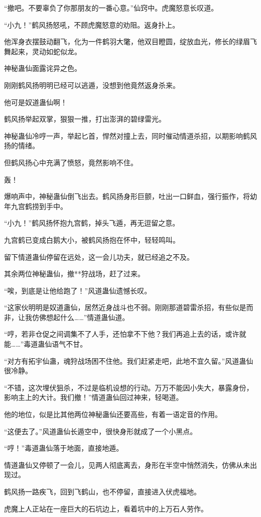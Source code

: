 \begin{this_body}
“撤吧。不要辜负了你那朋友的一番心意。”仙窍中。虎魔怒意长叹道。

“小九！”鹤风扬怒吼，不顾虎魔怒意的劝阻。返身扑上。

他浑身衣摆鼓动翻飞，化为一件鹤羽大氅，他双目瞪圆，绽放血光，修长的绿眉飞舞起来，灵动如蛇似龙。

神秘蛊仙面露诧异之色。

刚刚鹤风扬明明已经可以逃遁，没想到他竟然返身杀来。

他可是奴道蛊仙啊！

鹤风扬举起双掌，狠狠一推，打出澎湃的碧绿雷光。

神秘蛊仙冷哼一声，举起匕首，悍然对撞上去，同时催动情道杀招，以期影响鹤风扬的情绪。

但鹤风扬心中充满了愤怒，竟然影响不住。

轰！

爆响声中，神秘蛊仙倒飞出去。鹤风扬身形巨颤，吐出一口鲜血，强行振作，将幼年九宫鹤捞到手中。

“小九！”鹤风扬怀抱九宫鹤，掉头飞遁，再无逗留之意。

九宫鹤已变成白鹅大小，被鹤风扬抱在怀中，轻轻鸣叫。

留下情道蛊仙停留在远处，这一会儿功夫，就已经追之不及。

其余两位神秘蛊仙，撤**狩战场，赶了过来。

“唉，到底是让他给跑了！”风道蛊仙遗憾长叹。

“这家伙明明是奴道蛊仙，居然近身战斗也不弱。刚刚那道碧雷杀招，有些似是而非，让我仿佛想起什么……”情道蛊仙道。

“哼，若非仓促之间调集不了人手，还怕拿不下他？我们再追上去的话，或许就能……”毒道蛊仙语气不甘。

“对方有拓宇仙蛊，魂狩战场困不住他。我们赶紧走吧，此地不宜久留。”风道蛊仙很冷静。

“不错，这次埋伏狙杀，不过是临机设想的行动。万万不能因小失大，暴露身份，影响主上的大计。我们撤！”情道蛊仙回过神来，轻喝道。

他的地位，似是比其他两位神秘蛊仙还要高些，有着一语定音的作用。

“这便去了。”风道蛊仙长遁空中，很快身形就成了一个小黑点。

“哼！”毒道蛊仙落于地面，直接地遁。

情道蛊仙又停顿了一会儿，见两人彻底离去，身形在半空中悄然消失，仿佛从未出现过。

鹤风扬一路疾飞，回到飞鹤山，也不停留，直接进入伏虎福地。

虎魔上人正站在一座巨大的石坑边上，看着坑中的上万石人劳作。


\end{this_body}
